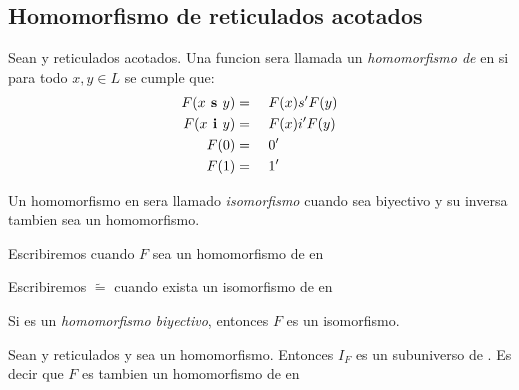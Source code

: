  \subsection{Homomorfismo de reticulados acotados}
  \begin{definition}
    Sean \reticulAcot y  reticulados acotados. Una funcion 
    sera llamada un \emph{homomorfismo de} \reticulAcot en  si para todo
    $x, y \in L$ se cumple que:
    \begin{alignat*}{4}
      F(x\textbf{ s }y) &=&\ & F(x) s' F(y)\\
      F(x\textbf{ i }y) &=&\ & F(x) i' F(y)\\
      F(0) &=&\ & 0'\\
      F(1) &=&\ & 1'
    \end{alignat*}

    Un homomorfismo \reticulAcot en  sera llamado \emph{isomorfismo} cuando
    sea biyectivo y su inversa tambien sea un homomorfismo. 

    Escribiremos  cuando $F$ sea un homomorfismo
  de \reticulAcot en 

  Escribiremos \reticulAcot $\tilde{=}$  cuando exista
  un isomorfismo de \reticulAcot en 
  \end{definition}

  \begin{lemma}
    Si  es un \emph{homomorfismo biyectivo},
    entonces $F$ es un isomorfismo.
  \end{lemma}
  \noproof
  \begin{lemma}
    Sean \reticulAcot y  reticulados y sea 
    un homomorfismo. Entonces $I_F$ es un subuniverso de . Es decir que $F$
    es tambien un homomorfismo de \reticulAcot en 
  \end{lemma}
  \noproof

